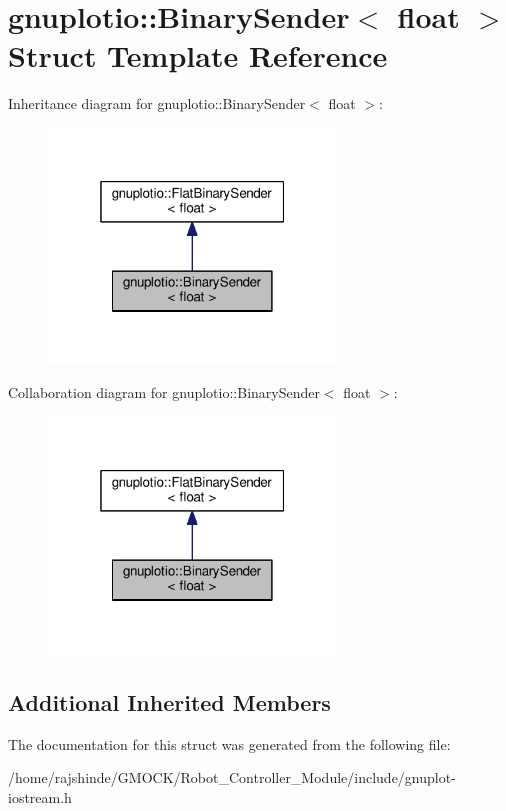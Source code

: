 \hypertarget{structgnuplotio_1_1_binary_sender_3_01float_01_4}{}\section{gnuplotio\+:\+:Binary\+Sender$<$ float $>$ Struct Template Reference}
\label{structgnuplotio_1_1_binary_sender_3_01float_01_4}


Inheritance diagram for gnuplotio\+:\+:Binary\+Sender$<$ float $>$\+:
\nopagebreak
\begin{figure}[H]
\begin{center}
\leavevmode
\includegraphics[width=217pt]{structgnuplotio_1_1_binary_sender_3_01float_01_4__inherit__graph}
\end{center}
\end{figure}


Collaboration diagram for gnuplotio\+:\+:Binary\+Sender$<$ float $>$\+:
\nopagebreak
\begin{figure}[H]
\begin{center}
\leavevmode
\includegraphics[width=217pt]{structgnuplotio_1_1_binary_sender_3_01float_01_4__coll__graph}
\end{center}
\end{figure}
\subsection*{Additional Inherited Members}


The documentation for this struct was generated from the following file\+:\begin{DoxyCompactItemize}
\item 
/home/rajshinde/\+G\+M\+O\+C\+K/\+Robot\+\_\+\+Controller\+\_\+\+Module/include/gnuplot-\/iostream.\+h\end{DoxyCompactItemize}
